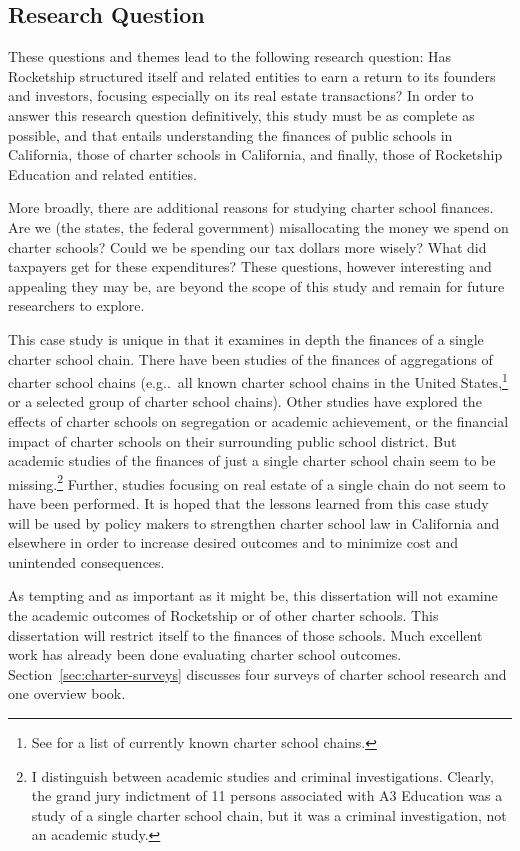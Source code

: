 \subsection{Research Question}\label{sec:research-questions}\indent

These questions and themes lead to the following research question: Has Rocketship structured itself and related entities to earn a return to its founders and investors, focusing especially on its real estate transactions? In order to answer this research question definitively, this study must be as complete as possible, and that entails understanding the finances of public schools in California, those of charter schools in California, and finally, those of Rocketship Education and related entities. 

More broadly, there are additional reasons for studying charter school finances. Are we (the states, the federal government) misallocating the money we spend on charter schools? Could we be spending our tax dollars more wisely? What did taxpayers get for these expenditures? These questions, however interesting and appealing they may be, are beyond the scope of this study and remain for future researchers to explore.

This case study is unique in that it examines in depth the finances of a single charter school chain. There have been studies of the finances of aggregations of charter school chains (e.g..~all known charter school chains in the United States,\footnote{See \textcite{Miron.etal2021} for a list of currently known charter school chains.} or a selected group of charter school chains). Other studies have explored the effects of charter schools on segregation or academic achievement, or the financial impact of charter schools on their surrounding public school district. But academic studies of the finances of just a single charter school chain seem to be missing.\footnote{I distinguish between academic studies and criminal investigations. Clearly, the grand jury indictment of 11 persons associated with A3 Education was a study of a single charter school chain, but it was a criminal investigation, not an academic study.} Further, studies focusing on real estate of a single chain do not seem to have been performed. It is hoped that the lessons learned from this case study will be used by policy makers to strengthen charter school law in California and elsewhere in order to increase desired outcomes and to minimize cost and unintended consequences.

As tempting and as important as it might be, this dissertation will not examine the academic outcomes of Rocketship or of other charter schools. This dissertation will restrict itself to the finances of those schools. Much excellent work has already been done evaluating charter school outcomes. Section~\ref{sec:charter-surveys} discusses four surveys of charter school research and one overview book.

